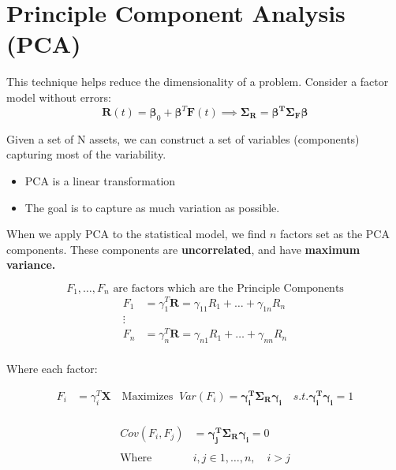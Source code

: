 \documentclass[
  oneside]{book}
\providecommand{\tightlist}{%
  \setlength{\itemsep}{0pt}\setlength{\parskip}{0pt}}
\begin{document}
\hypertarget{principle-component-analysis-pca}{%
\section{Principle Component Analysis (PCA)}\label{principle-component-analysis-pca}}

This technique helps reduce the dimensionality of a problem. Consider a factor model without errors:
\[
\mathbf{R}(t) = \boldsymbol{\beta}_{0}+\boldsymbol{\beta}^{T}\mathbf{F}(t) \implies \boldsymbol{\Sigma_{R}=\beta^{T}\Sigma_{F}\beta}
\]

Given a set of N assets, we can construct a set of variables (components) capturing most of the variability.

\begin{itemize}
\tightlist
\item
  PCA is a linear transformation
\item
  The goal is to capture as much variation as possible.
\end{itemize}

When we apply PCA to the statistical model, we find \(n\) factors set as the PCA components. These components are \textbf{uncorrelated}, and have \textbf{maximum variance.}

\[
F_{1},\dots,F_{n} \text{ are factors which are the Principle Components}
\]
\[
\begin{aligned}
F_{1} &= \gamma_{1}^{T}\mathbf{R} = \gamma_{11}R_{1}+\dots+\gamma_{1n}R_{n}\\
\vdots\\
F_{n} &= \gamma_{n}^{T}\mathbf{R} = \gamma_{n1}R_{1}+\dots+\gamma_{nn}R_{n}\\
\end{aligned}
\]

Where each factor:

\[
\begin{aligned}
F_{i} &= \gamma_{i}^{T}\mathbf{X} \quad \text{Maximizes } \ Var(F_{i})=\boldsymbol{\gamma_{i}^{T}\Sigma_{R}\gamma_{i}} \quad s.t. \boldsymbol{\gamma_{i}^{T}\gamma_{i}}=1\\
\end{aligned}
\]

\[
\begin{aligned}
Cov(F_{i},F_{j}) &= \boldsymbol{\gamma_{j}^{T}\Sigma_{R}\gamma_{i}} = 0\\
\\
\text{Where }& i,j\in 1,\dots,n, \quad i > j
\end{aligned}
\]
\end{document}
